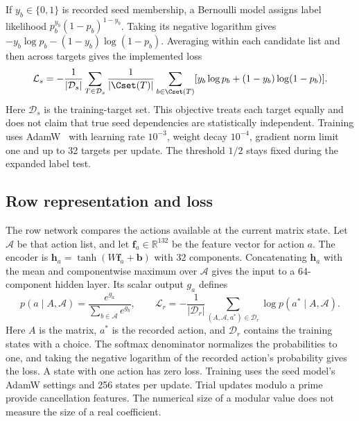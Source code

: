 If $y_b\in\{0,1\}$ is recorded seed membership, a Bernoulli model assigns label likelihood $p_b^{y_b}(1-p_b)^{1-y_b}$. Taking its negative logarithm gives $-y_b\log p_b-(1-y_b)\log(1-p_b)$. Averaging within each candidate list and then across targets gives the implemented loss
\begin{equation}
 \mathcal L_s=-\frac{1}{|\mathcal D_s|}\sum_{T\in\mathcal D_s}
 \frac{1}{|\Cset(T)|}\sum_{b\in\Cset(T)}
 [y_b\log p_b+(1-y_b)\log(1-p_b)].
 \label{eq:seed-loss}
\end{equation}
Here $\mathcal D_s$ is the training-target set. This objective treats each target equally and does not claim that true seed dependencies are statistically independent. Training uses AdamW~\cite{AdamW} with learning rate $10^{-3}$, weight decay $10^{-4}$, gradient norm limit one and up to 32 targets per update. The threshold $1/2$ stays fixed during the expanded label test.

\subsection{Row representation and loss}
The row network compares the actions available at the current matrix state. Let $\mathcal A$ be that action list, and let $\boldsymbol f_a\in\mathbb R^{132}$ be the feature vector for action $a$. The encoder is $\boldsymbol h_a=\tanh(W\boldsymbol f_a+\boldsymbol b)$ with 32 components. Concatenating $\boldsymbol h_a$ with the mean and componentwise maximum over $\mathcal A$ gives the input to a 64-component hidden layer. Its scalar output $g_a$ defines
\begin{equation}
 p(a\mid A,\mathcal A)=\frac{e^{g_a}}{\sum_{b\in\mathcal A}e^{g_b}},
 \qquad
 \mathcal L_r=-\frac{1}{|\mathcal D_r|}
       \sum_{(A,\mathcal A,a^*)\in\mathcal D_r}\log p(a^*\mid A,\mathcal A).
 \label{eq:row-loss}
\end{equation}
Here $A$ is the matrix, $a^*$ is the recorded action, and $\mathcal D_r$ contains the training states with a choice. The softmax denominator normalizes the probabilities to one, and taking the negative logarithm of the recorded action's probability gives the loss. A state with one action has zero loss. Training uses the seed model's AdamW settings and 256 states per update. Trial updates modulo a prime provide cancellation features. The numerical size of a modular value does not measure the size of a real coefficient.

